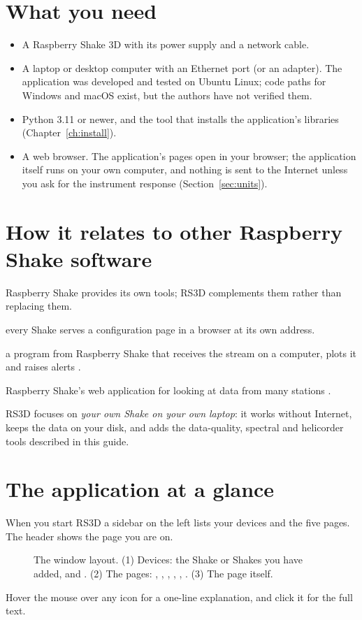 \section{What you need}
\begin{itemize}
\item A Raspberry Shake 3D with its power supply and a network cable.
\item A laptop or desktop computer with an Ethernet port (or an adapter). The application was developed and tested on Ubuntu
  Linux; code paths for Windows and macOS exist, but the authors have not verified them.
\item Python 3.11 or newer, and the  tool that installs the application's libraries (Chapter~\ref{ch:install}).
\item A web browser. The application's pages open in your browser; the application itself runs on your own computer, and nothing is
  sent to the Internet unless you ask for the instrument response (Section~\ref{sec:units}).
\end{itemize}

\section{How it relates to other Raspberry Shake software}
Raspberry Shake provides its own tools; RS3D complements them rather than replacing them.
\begin{description}[leftmargin=3cm,style=nextline]
\item[Raspberry Shake web page] every Shake serves a configuration page in a browser at its own address.
\item[rsudp] a program from Raspberry Shake that receives the stream on a computer, plots it and raises
  alerts \parencite{rsudp}.
\item[DataView] Raspberry Shake's web application for looking at data from many stations \parencite{raspishake}.
\end{description}
RS3D focuses on \emph{your own Shake on your own laptop}: it works without Internet, keeps the data on your disk, and
adds the data-quality, spectral and helicorder tools described in this guide.

\section{The application at a glance}
When you start RS3D a sidebar on the left lists your devices and the five pages. The header shows the page you are on.

\begin{figure}[tbp]
\centering
{}
\caption{The window layout. (1) Devices: the Shake or Shakes you have added, and . (2) The pages:
, , , , , . (3) The page itself.}
\end{figure}

Hover the mouse over any  icon for a one-line explanation, and click it for the full text.
